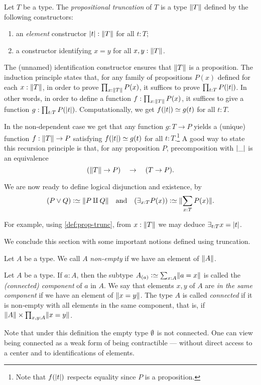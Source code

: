 \begin{definition}\label{def:prop-trunc}
Let $T$ be a type. The \emph{propositional truncation} of $T$
is a type  $\lVert T\rVert$ defined by the following constructors:
\begin{enumerate}
\item an \emph{element} constructor $\lvert t\rvert : \lVert T\rVert$ for all $t:T$;
\item a constructor identifying $x=y$  for all $x,y:\lVert T\rVert$.
\end{enumerate}
The (unnamed) identification constructor ensures that $\lVert T\rVert$ is a
proposition. The induction principle states that,
for any family of propositions $P(x)$ defined for each $x:\lVert T\rVert$, 
in order to prove $\prod_{x:\lVert T\rVert} P(x)$,
it suffices to prove $\prod_{t:T} P(\lvert t\rvert)$. In other
words, in order to define a function $f:\prod_{x:\lVert T\rVert} P(x)$,
it suffices to give a function $g: \prod_{t:T} P(\lvert t\rvert)$.
Computationally, we get $f(\trunc{t})\jdeq g(t)$ for all $t:T$. 
\end{definition}

In the non-dependent case we get that
any function $g: T\to P$ yields a (unique) function $f:\lVert T\rVert\to P$ 
satisfying $f(\trunc{t})\jdeq g(t)$ for all $t:T$.\footnote{%
Note that $f(\lvert t\rvert)$ respects equality since $P$ is a proposition.}
A good way to state this recursion principle is that, 
for any proposition $P$, precomposition with $\lvert\_\rvert$ is an equivalence
\[
(\lVert T\rVert \to P) \quad \to \quad (T \to P).
\]

We are now ready to define logical disjunction and existence, by
\[
(P \vee Q) \defeq \Trunc{P \amalg Q} \quad\text{and}
\quad (\exists_{x:T} P(x)) \defeq \Trunc{\sum_{x:T}P(x)}.
\]

For example, using \cref{def:prop-trunc}, 
from $x:\lVert T\rVert$ we may deduce $\exists_{t:T} x=\lvert t\rvert$.

We conclude this section with some important notions defined using truncation.

\begin{definition}\label{def:non-empty}
Let $A$ be a type. We call $A$ \emph{non-empty} if we have an element of $\lVert A\rVert$.
\end{definition}

\begin{definition}\label{def:connected}
  Let $A$ be a type. If $a:A$, then the subtype $A_{(a)}\defeq \sum_{x:A}\Trunc{a=x}$
  is called the \emph{(connected) component} of $a$ in $A$.
  We say that elements $x,y$ of $A$ are \emph{in the same component}
  if we have an element of $\lVert x=y\rVert$.
  The type $A$ is called \emph{connected} if it is non-empty with
  all elements in the same component, that is, if
  $\lVert A\rVert \times \prod_{x,y:A} \lVert x=y\rVert$.
\end{definition}
Note that under this definition the empty type $\emptyset$ is not connected.
One can view being connected as a weak form
of being contractible --- without direct access to a center and to
identifications of elements.

